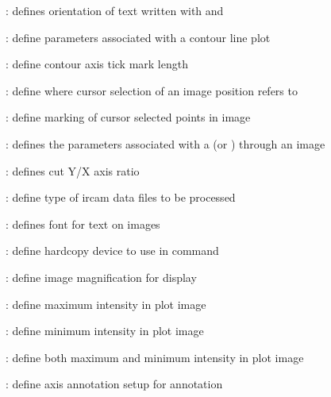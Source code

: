 \begin{description}
\begin{description}
\item []: defines orientation of text
written with {\bf {}} and {\bf {}}

\item []: define parameters associated with a
contour line plot

\item []: define contour axis tick mark
length

\item []: define where cursor selection of an
image position refers to

\item []: define marking of cursor
selected points in image

\item []: defines the parameters associated
with a {\bf {}} (or {\bf {}}) through
an image

\item []: defines cut Y/X axis ratio

\item []: define type of {\sc ircam} data
files to be processed

\item []: defines font for text on images

\item []: define hardcopy device to use in
{\bf {}} command

\item []: define image magnification for display

\item []: define maximum intensity in plot image

\item []: define minimum intensity in plot image

\item []: define both maximum and minimum
intensity in plot image

\item []: define axis annotation setup for
{\bf {}} annotation


\end{description}
\end{description}
